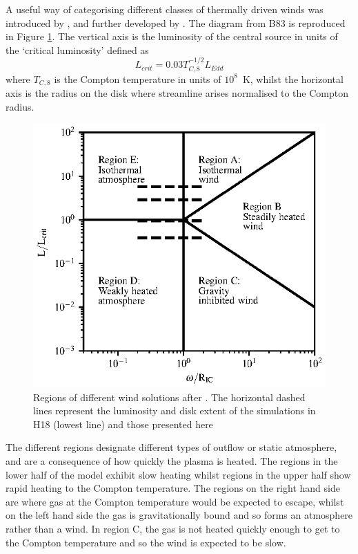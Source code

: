 \documentclass[a4paper,fleqn,usenatbib]{mnras}
\begin{document}
A useful way of categorising different classes of thermally driven winds was introduced 
by \cite[hereafter B83]{1983ApJ...271...70B}, and further developed by \cite[hereafter W96]{1996ApJ...461..767W}. The
diagram from B83 is reproduced in Figure  \ref{figure:regions}. The vertical axis is the luminosity of the central
source in units of the `critical luminosity' defined as
\begin{equation}
L_{crit}=0.03T_{C,8}^{-1/2}L_{Edd}
\label{L_crit}
\end{equation}
where $T_{C,8}$ is the Compton temperature in units of $10^8$~K,
whilst the horizontal axis is the radius on the disk where streamline arises normalised to the Compton radius. 

\begin{figure}
\includegraphics[width=\columnwidth]{figures/fig7.eps}
\caption{Regions of different wind solutions after \protect\cite{1983ApJ...271...70B}. The horizontal dashed 
lines represent the luminosity and disk extent of the simulations in H18
(lowest line) and those presented here}
\label{figure:regions}
\end{figure}

The different regions designate different types of outflow or static atmosphere, and are a consequence of
how quickly the plasma is heated. The regions in the lower half of the model exhibit slow heating 
whilst regions in the upper half show rapid heating to the Compton temperature. The regions on the
right hand side are where gas at the Compton temperature would be expected to escape, whilst on the 
left hand side the gas is gravitationally bound and so forms an atmosphere rather than a wind. 
In region C, the gas is not heated quickly enough to get to the Compton temperature and so the 
wind is expected to be slow.
\end{document}
